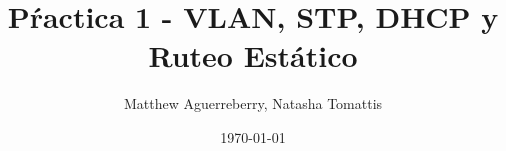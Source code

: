 \documentclass[letterpaper,12pt]{article}
\begin{document}
\title{Pŕactica 1 - VLAN, STP, DHCP y Ruteo Estático}
\author{Matthew Aguerreberry, Natasha Tomattis}
\date{\today}
\maketitle

\end{document}
